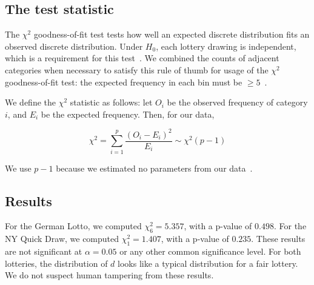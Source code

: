 

\subsection{The test statistic}

The $\chi^2$ goodness-of-fit test tests how well an expected discrete distribution fits
an observed discrete distribution. Under $H_0$, each 
lottery drawing is independent, which is a requirement for this test~\cite{openintrostats}. We combined the counts of adjacent categories when necessary to satisfy this rule of thumb for usage of the 
$\chi^2$ goodness-of-fit test: the expected frequency in each bin must be $\geq 5$~\cite{Drakakis}.

We define the $\chi^2$ statistic as follows: let $O_i$ be the observed frequency of category $i$, and $E_i$ be the expected frequency. Then, for our data,

\begin{equation}
    \chi^2 = \sum_{i=1}^p \frac{(O_i - E_i)^2}{E_i} \sim \chi^2 (p - 1)
\end{equation}

We use $p - 1$
because we estimated no parameters from our data~\cite{Drakakis}.

\subsection{Results}

For the German Lotto, we computed $\chi^2_6 = 5.357 $, with a p-value of $0.498$. For the NY Quick Draw, we computed $\chi^2_1 = 1.407$, with a p-value of $0.235$. These results are not significant at $\alpha = 0.05$ or 
any other common significance level. For both lotteries, the distribution of $d$ looks like a typical
distribution for a fair lottery. We do not suspect
human tampering from these results.

